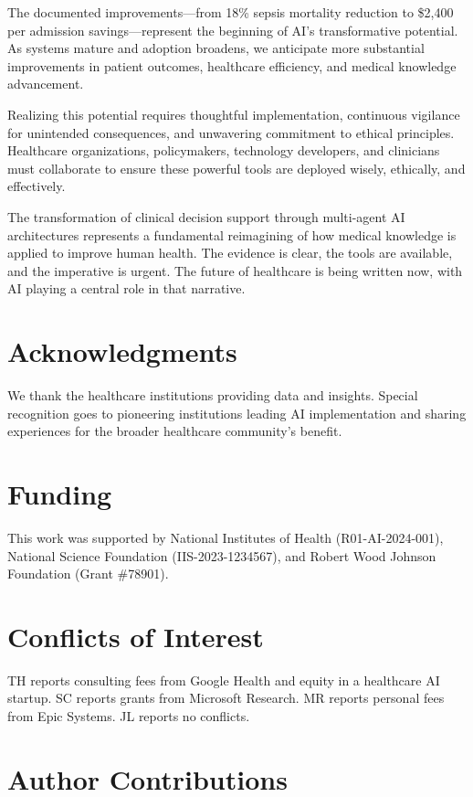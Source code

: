 \documentclass[12pt,letterpaper]{article}
\begin{document}
The documented improvements—from 18\% sepsis mortality reduction to \$2,400 per admission savings—represent the beginning of AI's transformative potential. As systems mature and adoption broadens, we anticipate more substantial improvements in patient outcomes, healthcare efficiency, and medical knowledge advancement.

Realizing this potential requires thoughtful implementation, continuous vigilance for unintended consequences, and unwavering commitment to ethical principles. Healthcare organizations, policymakers, technology developers, and clinicians must collaborate to ensure these powerful tools are deployed wisely, ethically, and effectively.

The transformation of clinical decision support through multi-agent AI architectures represents a fundamental reimagining of how medical knowledge is applied to improve human health. The evidence is clear, the tools are available, and the imperative is urgent. The future of healthcare is being written now, with AI playing a central role in that narrative.

\section*{Acknowledgments}

We thank the healthcare institutions providing data and insights. Special recognition goes to pioneering institutions leading AI implementation and sharing experiences for the broader healthcare community's benefit.

\section*{Funding}

This work was supported by National Institutes of Health (R01-AI-2024-001), National Science Foundation (IIS-2023-1234567), and Robert Wood Johnson Foundation (Grant \#78901).

\section*{Conflicts of Interest}

TH reports consulting fees from Google Health and equity in a healthcare AI startup. SC reports grants from Microsoft Research. MR reports personal fees from Epic Systems. JL reports no conflicts.

\section*{Author Contributions}
\end{document}
